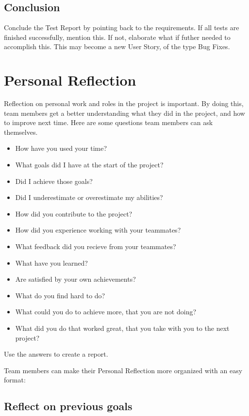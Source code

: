 \documentclass[10pt]{report}
\begin{document}
\subsection{Conclusion}

Conclude the Test Report by pointing back to the requirements. If all tests are finished successfully, mention this. If not, elaborate what if futher needed to accomplish this. This may become a new User Story, of the type Bug Fixes.

\newpage

\section{Personal Reflection}

Reflection on personal work and roles in the project is important. By doing this, team members get a better understanding what they did in the project, and how to improve next time. Here are some questions team members can ask themselves. 

\begin{itemize}
	\item How have you used your time?
	\item What goals did I have at the start of the project?
	\item Did I achieve those goals?
	\item Did I underestimate or overestimate my abilities?
	\item How did you contribute to the project?
	\item How did you experience working with your teammates?
	\item What feedback did you recieve from your teammates?
	\item What have you learned?
	\item Are satisfied by your own achievements?
	\item What do you find hard to do?
	\item What could you do to achieve more, that you are not doing?
	\item What did you do that worked great, that you take with you to the next project?
\end{itemize}

Use the answers to create a report.

\bigskip

Team members can make their Personal Reflection more organized with an easy format:

\subsection{Reflect on previous goals}
\end{document}
